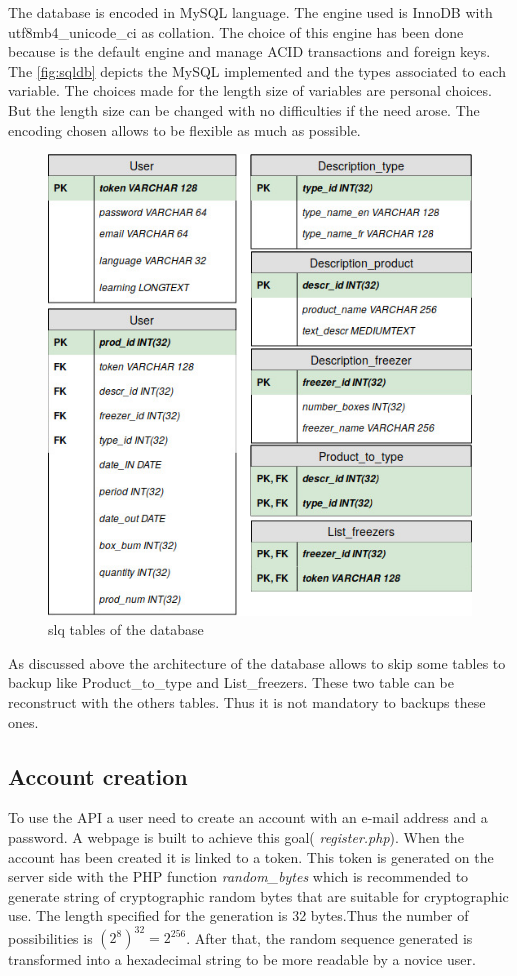 The database is encoded in MySQL language. The engine used is InnoDB with utf8mb4\_unicode\_ci as collation. The choice of this engine has been done because is the default engine and manage ACID transactions and foreign keys. The \autoref{fig:sqldb} depicts the MySQL implemented and the types associated to each variable. The choices made for the length size of variables are personal choices. But the length size can be changed with no difficulties if the need arose. The encoding chosen allows to be flexible as much as possible.

\begin{figure}[H]
\centering
\includegraphics[scale=0.5]{./images/sqldb.jpg}
\caption{slq tables of the database}
\label{fig:sqldb}
\end{figure}

As discussed above the architecture of the database allows to skip some tables to backup like Product\_to\_type and List\_freezers. These two table can be reconstruct with the others tables. Thus it is not mandatory to backups these ones.

\subsection{Account creation}
To use the API a user need to create an account with an e-mail address and a password. A webpage is built to achieve this goal( \textit{register.php}). When the account has been created it is linked to a token. This token is generated on the server side with the PHP function \textit{random\_bytes} which is recommended to generate string of cryptographic random bytes that are suitable for cryptographic use. The length  specified for the generation is 32 bytes.Thus the number of possibilities is $(2^8)^32 = 2^256$. After that, the random sequence generated is transformed into a hexadecimal string to be more readable by a novice user.\\

